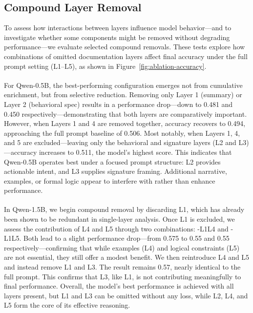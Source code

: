 \documentclass[a4paper]{usiinfbachelorproject}
\begin{document}
\subsection{Compound Layer Removal}

To assess how interactions between layers influence model behavior—and to investigate whether some components might be removed without degrading performance—we evaluate selected compound removals. These tests explore how combinations of omitted documentation layers affect final accuracy under the full prompt setting (L1–L5), as shown in Figure~\ref{fig:ablation-accuracy}. \\
\\
For Qwen-0.5B, the best-performing configuration emerges not from cumulative enrichment, but from selective reduction. Removing only Layer 1 (summary) or Layer 2 (behavioral spec) results in a performance drop—down to 0.481 and 0.450 respectively—demonstrating that both layers are comparatively important. However, when Layers 1 and 4 are removed together, accuracy recovers to 0.494, approaching the full prompt baseline of 0.506. Most notably, when Layers 1, 4, and 5 are excluded—leaving only the behavioral and signature layers (L2 and L3)—accuracy increases to 0.511, the model's highest score. This indicates that Qwen-0.5B operates best under a focused prompt structure: L2 provides actionable intent, and L3 supplies signature framing. Additional narrative, examples, or formal logic appear to interfere with rather than enhance performance. \\
\\
In Qwen-1.5B, we begin compound removal by discarding L1, which has already been shown to be redundant in single-layer analysis. Once L1 is excluded, we assess the contribution of L4 and L5 through two combinations: -L1L4 and -L1L5. Both lead to a slight performance drop—from 0.575 to 0.55 and 0.55 respectively—confirming that while examples (L4) and logical constraints (L5) are not essential, they still offer a modest benefit. We then reintroduce L4 and L5 and instead remove L1 and L3. The result remains 0.57, nearly identical to the full prompt. This confirms that L3, like L1, is not contributing meaningfully to final performance. Overall, the model's best performance is achieved with all layers present, but L1 and L3 can be omitted without any loss, while L2, L4, and L5 form the core of its effective reasoning. \\
\\
\end{document}
